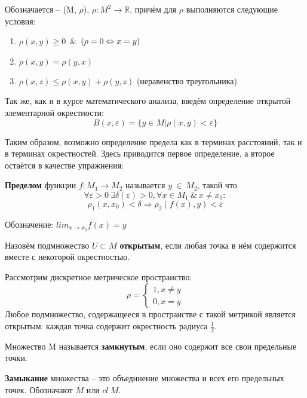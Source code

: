 	Обозначается -- (M, $\rho$), $\rho : M^2 \rightarrow 
	\mathbb{R}$, причём для $\rho$ выполняются следующие условия:
	\begin{enumerate}
		\item $\rho(x,y) \geq 0$~$\&$~$(\rho = 0 \Leftrightarrow x=y)$
		\item $\rho(x,y) = \rho(y,x)$
		\item $\rho(x,z) \leq \rho(x,y) + \rho(y,z)$ (неравенство треугольника)
	\end{enumerate}
	
	Так же, как и в курсе математического анализа, введём определение открытой элементарной окрестности:
	$$B(x, \varepsilon) = \{y \in M | \rho(x,y) < \varepsilon\}$$
	
	Таким образом, возможно определение предела как в терминах расстояний, так и в терминах окрестностей. Здесь приводится первое 
	определение, а второе остаётся в качестве упражнения:
	
	\begin{defi}
		\textbf{Пределом} функции $f : M_1 \rightarrow M_2$ называется $y~\in~M_2$, такой что 
		$$\forall \varepsilon > 0 ~\exists 
		\delta(\varepsilon) > 0, \forall x \in M_1 ~\&~ x  \neq x_0 : $$
		$$\rho_1(x, x_0) < \delta \Rightarrow \rho_2(f(x), y) < \varepsilon$$
	\end{defi}
	
	Обозначение: $lim_{x \rightarrow x_0} f(x) = y$
	
	\begin{defi}
		Назовём подмножество $U \subset M$ \textbf{открытым}, если любая точка в нём содержится вместе с некоторой окрестностью.
	\end{defi}
	
	\example Рассмотрим дискретное метрическое пространство:
	$$
		\rho = 
		\begin{cases}
			1, x \neq y \\
			0, x = y
		\end{cases}
	$$
	Любое подмножество, содержащееся в пространстве с такой метрикой является открытым: каждая точка содержит окрестность радиуса 
	$\frac{1}{2}$.
	
	\begin{defi}
		Множество M называется \textbf{замкнутым}, если оно содержит все свои предельные точки.
	\end{defi}
	
	\begin{defi}
		\textbf{Замыкание} множества -- это объединение множества и всех его предельных точек. Обозначают $\overline{M}$ или $cl ~ M$.
	\end{defi}
	
